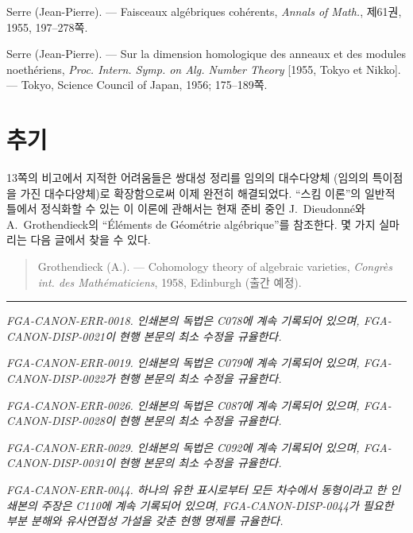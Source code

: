 \noindent[3] Serre (Jean-Pierre). --- Faisceaux algébriques cohérents,
\emph{Annals of Math.}, 제61권, 1955, 197--278쪽.

\noindent[4] Serre (Jean-Pierre). --- Sur la dimension homologique des anneaux
et des modules noethériens, \emph{Proc. Intern. Symp. on Alg. Number Theory}
[1955, Tokyo et Nikko]. --- Tokyo, Science Council of Japan, 1956;
175--189쪽.

\clearpage
{}
\section*{추기}

13쪽의 비고에서 지적한 어려움들은 쌍대성 정리를 임의의 대수다양체
(임의의 특이점을 가진 대수다양체)로 확장함으로써 이제 완전히
해결되었다. ``스킴 이론''의 일반적 틀에서 정식화할 수 있는 이 이론에
관해서는 현재 준비 중인 J.~Dieudonné와 A.~Grothendieck의
``Éléments de Géométrie algébrique''를 참조한다. 몇 가지 실마리는 다음
글에서 찾을 수 있다.

\begin{quote}
Grothendieck (A.). --- Cohomology theory of algebraic varieties,
\emph{Congrès int. des Mathématiciens}, 1958, Edinburgh (출간 예정).
\end{quote}

\begin{flushright}
[1959년 4월]
\end{flushright}

\begin{center}\rule{36mm}{0.5pt}\end{center}

\par\smallskip
\begingroup\footnotesize
\noindent\textit{FGA-CANON-ERR-0018. 인쇄본의 독법은 C078에 계속 기록되어 있으며, FGA-CANON-DISP-0021이 현행 본문의 최소 수정을 규율한다.}\par
\noindent\textit{FGA-CANON-ERR-0019. 인쇄본의 독법은 C079에 계속 기록되어 있으며, FGA-CANON-DISP-0022가 현행 본문의 최소 수정을 규율한다.}\par
\noindent\textit{FGA-CANON-ERR-0026. 인쇄본의 독법은 C087에 계속 기록되어 있으며, FGA-CANON-DISP-0028이 현행 본문의 최소 수정을 규율한다.}\par
\noindent\textit{FGA-CANON-ERR-0029. 인쇄본의 독법은 C092에 계속 기록되어 있으며, FGA-CANON-DISP-0031이 현행 본문의 최소 수정을 규율한다.}\par
\noindent\textit{FGA-CANON-ERR-0044. 하나의 유한 표시로부터 모든 차수에서 동형이라고 한 인쇄본의 주장은 C110에 계속 기록되어 있으며, FGA-CANON-DISP-0044가 필요한 부분 분해와 유사연접성 가설을 갖춘 현행 명제를 규율한다.}\par
\endgroup
